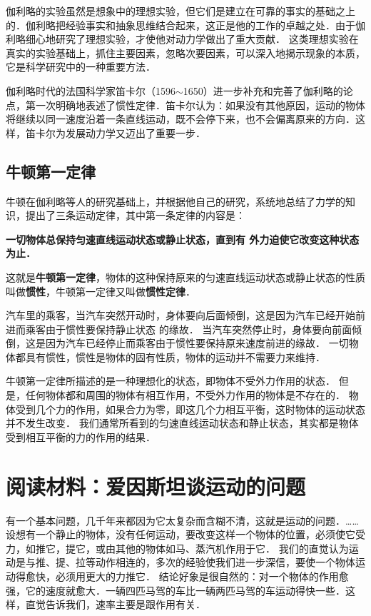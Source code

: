 伽利略的实验虽然是想象中的理想实验，但它们是建立在可靠的事实的基础之上的．伽利略把经验事实和抽象思维结合起来，这正是他的工作的卓越之处．由于伽利略细心地研究了理想实验，才使他对动力学做出了重大贡献．
这类理想实验在真实的实验基础上，抓住主要因素，忽略次要因素，可以深入地揭示现象的本质，它是科学研究中的一种重要方法．

伽利略时代的法国科学家笛卡尔（1596$\sim$1650）进一步补充和完善了伽利略的论点，第一次明确地表述了惯性定律．笛卡尔认为：如果没有其他原因，运动的物体将继续以同一速度沿着一条直线运动，既不会停下来，也不会偏离原来的方向．这样，笛卡尔为发展动力学又迈出了重要一步．

\subsection{牛顿第一定律} 
牛顿在伽利略等人的研究基础上，并根据他自己的研究，系统地总结了力学的知识，提出了三条运动定律，其中第一条定律的内容是：

\textbf{一切物体总保持匀速直线运动状态或静止状态，直到有
外力迫使它改变这种状态为止．}

这就是\textbf{牛顿第一定律}，物体的这种保持原来的匀速直线运动状态或静止状态的性质叫做\textbf{惯性}，牛顿第一定律又叫做\textbf{惯性定律}．

汽车里的乘客，当汽车突然开动时，身体要向后面倾倒，这是因为汽车已经开始前进而乘客由于惯性要保持静止状态
的缘故．
当汽车突然停止时，身体要向前面倾倒，这是因为汽车已经停止而乘客由于惯性要保持原来速度前进的缘故．
一切物体都具有惯性，惯性是物体的固有性质，物体的运动并不需要力来维持．

牛顿第一定律所描述的是一种理想化的状态，即物体不受外力作用的状态．
但是，任何物体都和周围的物体有相互作用，不受外力作用的物体是不存在的．
物体受到几个力的作用，如果合力为零，即这几个力相互平衡，这时物体的运动状态并不发生改变．
我们通常所看到的匀速直线运动状态和静止状态，其实都是物体受到相互平衡的力的作用的结果．

\section*{阅读材料：爱因斯坦谈运动的问题}
有一个基本问题，几千年来都因为它太复杂而含糊不清，这就是运动的问题．……设想有一个静止的物体，没有任何运动，要改变这样一个物体的位置，必须使它受力，如推它，提它，或由其他的物体如马、蒸汽机作用于它．
我们的直觉认为运动是与推、提、拉等动作相连的，多次的经验使我们进一步深信，要使一个物体运动得愈快，必须用更大的力推它．
结论好象是很自然的：对一个物体的作用愈强，它的速度就愈大．一辆四匹马驾的车比一辆两匹马驾的车运动得快一些．这样，直觉告诉我们，速率主要是跟作用有关．


